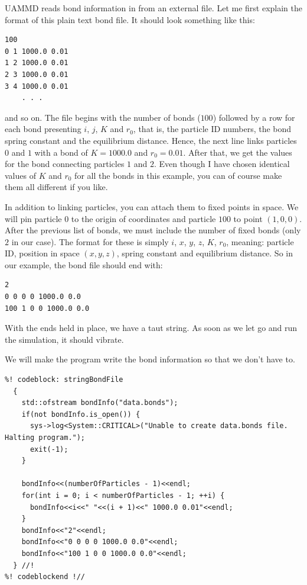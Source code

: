 UAMMD reads bond information in from an external file. Let me first explain the
format of this plain text bond file. It should look something like this:
\begin{lstlisting}
100
0 1 1000.0 0.01
1 2 1000.0 0.01
2 3 1000.0 0.01
3 4 1000.0 0.01
    . . .
\end{lstlisting}
and so on. The file begins with the number of bonds ($100$) followed by a row
for each bond presenting $i$, $j$, $K$ and $r_0$, that is, the particle ID
numbers, the bond spring constant and the equilibrium distance. Hence, the next
line links particles $0$ and $1$ with a bond of $K = 1000.0$ and $r_0 = 0.01$.
After that, we get the values for the bond connecting particles $1$ and $2$.
Even though I have chosen identical values of $K$ and $r_0$ for all the bonds in
this example, you can of course make them all different if you like.

In addition to linking particles, you can attach them to fixed points in space.
We will pin particle $0$ to the origin of coordinates and particle $100$ to
point $(1, 0, 0)$. After the previous list of bonds, we must include the number
of fixed bonds (only $2$ in our case). The format for these is simply $i$, $x$,
$y$, $z$, $K$, $r_0$, meaning: particle ID, position in space $(x, y, z)$,
spring constant and equilibrium distance. So in our example, the bond file
should end with:
\begin{lstlisting}
2
0 0 0 0 1000.0 0.0
100 1 0 0 1000.0 0.0
\end{lstlisting}
With the ends held in place, we have a taut string. As soon as we let go and run
the simulation, it should vibrate.

We will make the program write the bond information so that we don't have to.
\begin{lstlisting}
%! codeblock: stringBondFile
  {
    std::ofstream bondInfo("data.bonds");
    if(not bondInfo.is_open()) {
      sys->log<System::CRITICAL>("Unable to create data.bonds file. Halting program.");
      exit(-1);
    }

    bondInfo<<(numberOfParticles - 1)<<endl;
    for(int i = 0; i < numberOfParticles - 1; ++i) {
      bondInfo<<i<<" "<<(i + 1)<<" 1000.0 0.01"<<endl;
    }
    bondInfo<<"2"<<endl;
    bondInfo<<"0 0 0 0 1000.0 0.0"<<endl;
    bondInfo<<"100 1 0 0 1000.0 0.0"<<endl;
  } //!
%! codeblockend !//
\end{lstlisting}

